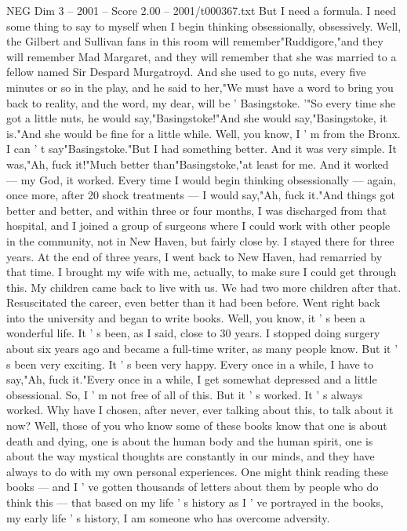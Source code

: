 \begin{textsample}{NEG Dim 3 – 2001 – Score 2.00 – 2001/t000367.txt}
But I need a formula.
I need some thing to say to myself when I begin thinking obsessionally, obsessively.
Well, the Gilbert and Sullivan fans in this room will remember"Ruddigore,"and they will remember Mad Margaret, and they will remember that she was married to a fellow named Sir Despard Murgatroyd.
And she used to go nuts, every five minutes or so in the play, and he said to her,"We must have a word to bring you back to reality, and the word, my dear, will be ' Basingstoke. '"So every time she got a little nuts, he would say,"Basingstoke!"And she would say,"Basingstoke, it is."And she would be fine for a little while.
Well, you know, I ' m from the Bronx.
I can ' t say"Basingstoke."But I had something better.
And it was very simple.
It was,"Ah, fuck it!"Much better than"Basingstoke,"at least for me.
And it worked — my God, it worked.
Every time I would begin thinking obsessionally — again, once more, after 20 shock treatments — I would say,"Ah, fuck it."And things got better and better, and within three or four months, I was discharged from that hospital, and I joined a group of surgeons where I could work with other people in the community, not in New Haven, but fairly close by.
I stayed there for three years.
At the end of three years, I went back to New Haven, had remarried by that time.
I brought my wife with me, actually, to make sure I could get through this.
My children came back to live with us.
We had two more children after that.
Resuscitated the career, even better than it had been before.
Went right back into the university and began to write books.
Well, you know, it ' s been a wonderful life.
It ' s been, as I said, close to 30 years.
I stopped doing surgery about six years ago and became a full-time writer, as many people know.
But it ' s been very exciting.
It ' s been very happy.
Every once in a while, I have to say,"Ah, fuck it."Every once in a while, I get somewhat depressed and a little obsessional.
So, I ' m not free of all of this.
But it ' s worked.
It ' s always worked.
Why have I chosen, after never, ever talking about this, to talk about it now?
Well, those of you who know some of these books know that one is about death and dying, one is about the human body and the human spirit, one is about the way mystical thoughts are constantly in our minds, and they have always to do with my own personal experiences.
One might think reading these books — and I ' ve gotten thousands of letters about them by people who do think this — that based on my life ' s history as I ' ve portrayed in the books, my early life ' s history, I am someone who has overcome adversity.

\end{textsample}
